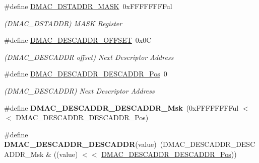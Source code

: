 \begin{DoxyCompactItemize}
\item 
\hypertarget{group___s_a_m_l21___d_m_a_c_ga774a0eed386076ad7e52c56d11bcb467}{}\#define \hyperlink{group___s_a_m_l21___d_m_a_c_ga774a0eed386076ad7e52c56d11bcb467}{D\+M\+A\+C\+\_\+\+D\+S\+T\+A\+D\+D\+R\+\_\+\+M\+A\+S\+K}~0x\+F\+F\+F\+F\+F\+F\+F\+Ful\label{group___s_a_m_l21___d_m_a_c_ga774a0eed386076ad7e52c56d11bcb467}

\begin{DoxyCompactList}\small\item\em (D\+M\+A\+C\+\_\+\+D\+S\+T\+A\+D\+D\+R) M\+A\+S\+K Register \end{DoxyCompactList}\item 
\hypertarget{group___s_a_m_l21___d_m_a_c_gac8d037cbab1cc4bac9e23bbb54f73998}{}\#define \hyperlink{group___s_a_m_l21___d_m_a_c_gac8d037cbab1cc4bac9e23bbb54f73998}{D\+M\+A\+C\+\_\+\+D\+E\+S\+C\+A\+D\+D\+R\+\_\+\+O\+F\+F\+S\+E\+T}~0x0\+C\label{group___s_a_m_l21___d_m_a_c_gac8d037cbab1cc4bac9e23bbb54f73998}

\begin{DoxyCompactList}\small\item\em (D\+M\+A\+C\+\_\+\+D\+E\+S\+C\+A\+D\+D\+R offset) Next Descriptor Address \end{DoxyCompactList}\item 
\hypertarget{group___s_a_m_l21___d_m_a_c_gadc677fbace02e86b543495c36920e405}{}\#define \hyperlink{group___s_a_m_l21___d_m_a_c_gadc677fbace02e86b543495c36920e405}{D\+M\+A\+C\+\_\+\+D\+E\+S\+C\+A\+D\+D\+R\+\_\+\+D\+E\+S\+C\+A\+D\+D\+R\+\_\+\+Pos}~0\label{group___s_a_m_l21___d_m_a_c_gadc677fbace02e86b543495c36920e405}

\begin{DoxyCompactList}\small\item\em (D\+M\+A\+C\+\_\+\+D\+E\+S\+C\+A\+D\+D\+R) Next Descriptor Address \end{DoxyCompactList}\item 
\hypertarget{group___s_a_m_l21___d_m_a_c_gafc8a36fa8a08775ebbb634f97170f868}{}\#define {\bfseries D\+M\+A\+C\+\_\+\+D\+E\+S\+C\+A\+D\+D\+R\+\_\+\+D\+E\+S\+C\+A\+D\+D\+R\+\_\+\+Msk}~(0x\+F\+F\+F\+F\+F\+F\+F\+Ful $<$$<$ D\+M\+A\+C\+\_\+\+D\+E\+S\+C\+A\+D\+D\+R\+\_\+\+D\+E\+S\+C\+A\+D\+D\+R\+\_\+\+Pos)\label{group___s_a_m_l21___d_m_a_c_gafc8a36fa8a08775ebbb634f97170f868}

\item 
\hypertarget{group___s_a_m_l21___d_m_a_c_gaeb483ef19c5358fba1c6b4ab5e247007}{}\#define {\bfseries D\+M\+A\+C\+\_\+\+D\+E\+S\+C\+A\+D\+D\+R\+\_\+\+D\+E\+S\+C\+A\+D\+D\+R}(value)~(D\+M\+A\+C\+\_\+\+D\+E\+S\+C\+A\+D\+D\+R\+\_\+\+D\+E\+S\+C\+A\+D\+D\+R\+\_\+\+Msk \& ((value) $<$$<$ \hyperlink{group___s_a_m_l21___d_m_a_c_gadc677fbace02e86b543495c36920e405}{D\+M\+A\+C\+\_\+\+D\+E\+S\+C\+A\+D\+D\+R\+\_\+\+D\+E\+S\+C\+A\+D\+D\+R\+\_\+\+Pos}))\label{group___s_a_m_l21___d_m_a_c_gaeb483ef19c5358fba1c6b4ab5e247007}


\end{DoxyCompactItemize}
